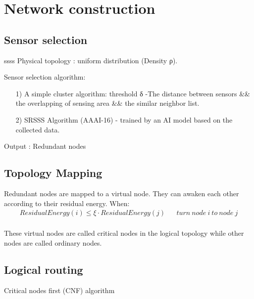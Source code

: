 \section{Network construction}

\subsection{Sensor selection}
ssss
Physical topology :  uniform distribution (Density ρ).

Sensor selection algorithm:
\begin{itemize}
\item[1)] A simple cluster algorithm: threshold δ -The distance between sensors \&\& the overlapping of sensing area \&\& the similar neighbor list. 
\item[2)] SRSSS Algorithm (AAAI-16) - trained by an AI model based on the collected data. 
\end{itemize}

Output : Redundant nodes

\subsection{Topology Mapping}

Redundant nodes are mapped to a virtual node. 
They can awaken each other according to their  residual energy. 
When:    
$$
\begin{aligned}                        
ResidualEnergy(i) \leq \xi \cdot ResidualEnergy(j) & &   {turn~node~i~to~node~j}\\
\end{aligned}
$$

These virtual nodes are called critical nodes in the logical topology while other nodes are called ordinary nodes.

\subsection{Logical routing}

Critical nodes first (CNF) algorithm
